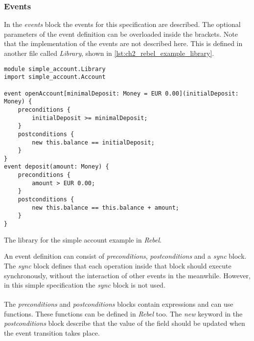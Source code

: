 \subsubsection{Events}
In the \textit{events} block the events for this specification are described.
The optional parameters of the event definition can be overloaded inside the
brackets. Note that the implementation of the events are not described here.
This is defined in another file called \textit{Library}, shown in
\autoref{lst:ch2_rebel_example_library}.
\begin{sourcecode}[!ht]
\begin{lstlisting}[language=Rebel]
module simple_account.Library
import simple_account.Account

event openAccount[minimalDeposit: Money = EUR 0.00](initialDeposit: Money) {
    preconditions {
        initialDeposit >= minimalDeposit;
    }
    postconditions {
        new this.balance == initialDeposit;
    }
}
event deposit(amount: Money) {
    preconditions {
        amount > EUR 0.00;
    }
    postconditions {
        new this.balance == this.balance + amount;
    }
}
\end{lstlisting}
\caption{The library for the simple account example in \textit{Rebel}.}
\label{lst:ch2_rebel_example_library}
\end{sourcecode}
\FloatBarrier\noindent
An event definition can consist of \textit{preconditions},
\textit{postconditions} and a \textit{sync} block. The \textit{sync} block
defines that each operation inside that block should execute synchronously,
without the interaction of other events in the meanwhile. However, in this
simple specification the \textit{sync} block is not used.\\
\\
The \textit{preconditions} and \textit{postconditions} blocks contain
expressions and can use functions. These functions can be defined in
\textit{Rebel} too. The \textit{new} keyword in the \textit{postconditions}
block describe that the value of the field should be updated when the event
transition takes place.

